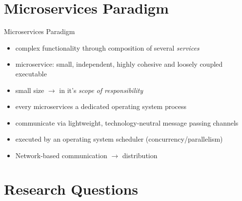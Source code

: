 \documentclass{beamer}
\begin{document}


  


\section{Microservices Paradigm}


\begin{frame}{Microservices Paradigm}

\begin{itemize}
  \item complex functionality through composition of several \textit{services}
  \item microservice: small, independent, highly cohesive and loosely coupled executable
  \item \glqq small\grqq{} size $\rightarrow$ in it's \textit{scope of responsibility}
  \item every microservices a dedicated operating system process
  \item communicate via lightweight, technology-neutral message passing channels
  \item executed by an operating system scheduler (concurrency/parallelism)
  \item Network-based communication $\rightarrow$ distribution
\end{itemize}

\end{frame}


\section{Research Questions}
\end{document}
